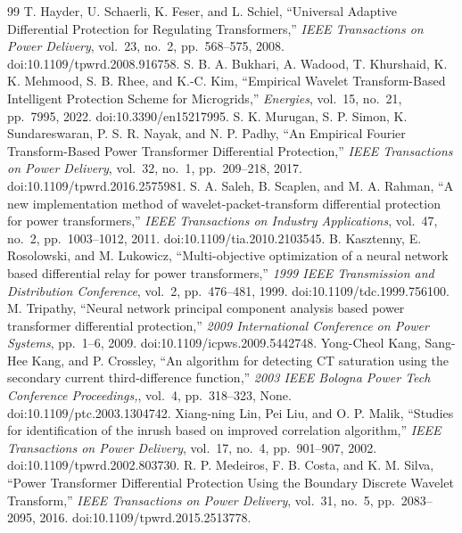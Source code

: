 \documentclass[12pt,a4paper,oneside]{report}
\begin{document}
\begin{thebibliography}{99}
 T. Hayder, U. Schaerli, K. Feser, and L. Schiel, ``Universal Adaptive Differential Protection for Regulating Transformers,'' \textit{IEEE Transactions on Power Delivery}, vol.~23, no.~2, pp.~568--575, 2008. doi:10.1109/tpwrd.2008.916758.
 S. B. A. Bukhari, A. Wadood, T. Khurshaid, K. K. Mehmood, S. B. Rhee, and K.-C. Kim, ``Empirical Wavelet Transform-Based Intelligent Protection Scheme for Microgrids,'' \textit{Energies}, vol.~15, no.~21, pp.~7995, 2022. doi:10.3390/en15217995.
 S. K. Murugan, S. P. Simon, K. Sundareswaran, P. S. R. Nayak, and N. P. Padhy, ``An Empirical Fourier Transform-Based Power Transformer Differential Protection,'' \textit{IEEE Transactions on Power Delivery}, vol.~32, no.~1, pp.~209--218, 2017. doi:10.1109/tpwrd.2016.2575981.
 S. A. Saleh, B. Scaplen, and M. A. Rahman, ``A new implementation method of wavelet-packet-transform differential protection for power transformers,'' \textit{IEEE Transactions on Industry Applications}, vol.~47, no.~2, pp.~1003--1012, 2011. doi:10.1109/tia.2010.2103545.
 B. Kasztenny, E. Rosolowski, and M. Lukowicz, ``Multi-objective optimization of a neural network based differential relay for power transformers,'' \textit{1999 IEEE Transmission and Distribution Conference}, vol.~2, pp.~476--481, 1999. doi:10.1109/tdc.1999.756100.
 M. Tripathy, ``Neural network principal component analysis based power transformer differential protection,'' \textit{2009 International Conference on Power Systems}, pp.~1--6, 2009. doi:10.1109/icpws.2009.5442748.
 Yong-Cheol Kang, Sang-Hee Kang, and P. Crossley, ``An algorithm for detecting CT saturation using the secondary current third-difference function,'' \textit{2003 IEEE Bologna Power Tech Conference Proceedings,}, vol.~4, pp.~318--323, None. doi:10.1109/ptc.2003.1304742.
 Xiang-ning Lin, Pei Liu, and O. P. Malik, ``Studies for identification of the inrush based on improved correlation algorithm,'' \textit{IEEE Transactions on Power Delivery}, vol.~17, no.~4, pp.~901--907, 2002. doi:10.1109/tpwrd.2002.803730.
 R. P. Medeiros, F. B. Costa, and K. M. Silva, ``Power Transformer Differential Protection Using the Boundary Discrete Wavelet Transform,'' \textit{IEEE Transactions on Power Delivery}, vol.~31, no.~5, pp.~2083--2095, 2016. doi:10.1109/tpwrd.2015.2513778.

\end{thebibliography}
\end{document}

